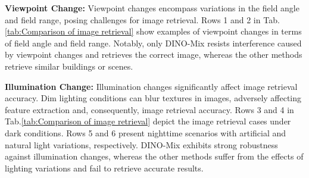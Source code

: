     \textbf{Viewpoint Change:} Viewpoint changes encompass variations in the field angle and field range, posing challenges for image retrieval. Rows 1 and 2 in Tab.\ref{tab:Comparison of image retrieval} show examples of viewpoint changes in terms of field angle and field range. Notably, only DINO-Mix resists interference caused by viewpoint changes and retrieves the correct image, whereas the other methods retrieve similar buildings or scenes.

    \textbf{Illumination Change:} Illumination changes significantly affect image retrieval accuracy. Dim lighting conditions can blur textures in images, adversely affecting feature extraction and, consequently, image retrieval accuracy. Rows 3 and 4 in Tab.\ref{tab:Comparison of image retrieval} depict the image retrieval cases under dark conditions. Rows 5 and 6 present nighttime scenarios with artificial and natural light variations, respectively. DINO-Mix exhibits strong robustness against illumination changes, whereas the other methods suffer from the effects of lighting variations and fail to retrieve accurate results.

